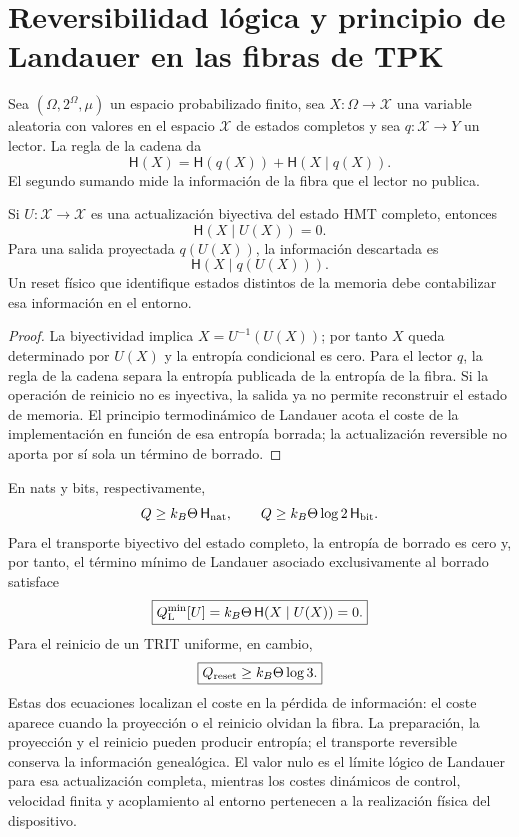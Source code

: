 \section{Reversibilidad lógica y principio de Landauer en las fibras de TPK}
\label{sec:informacion-fibra-landauer-rev7}

Sea \((\Omega,2^\Omega,\mu)\) un espacio probabilizado finito, sea
\(X:\Omega\to\mathcal X\) una variable aleatoria con valores en el espacio
\(\mathcal X\) de estados completos y sea \(q:\mathcal X\to Y\) un lector.
La regla de la cadena da
\[
 \mathsf H(X)
 =
 \mathsf H(q(X))+\mathsf H(X\mid q(X)).
\]
El segundo sumando mide la información de la fibra que el lector no
publica.

\begin{theorem}
\label{thm:landauer-relativo-lector-rev7}
Si \(U:\mathcal X\to\mathcal X\) es una actualización biyectiva del estado
HMT completo,
entonces
\[
 \boxed{\mathsf H(X\mid U(X))=0.}
\]
Para una salida proyectada \(q(U(X))\), la información descartada es
\[
 \mathsf H(X\mid q(U(X))).
\]
Un reset físico que identifique estados distintos de la memoria debe
contabilizar esa información en el entorno.
\end{theorem}

\begin{proof}
La biyectividad implica
\(X=U^{-1}(U(X))\); por tanto \(X\) queda determinado por \(U(X)\) y la
entropía condicional es cero. Para el lector \(q\), la regla de la cadena
separa la entropía publicada de la entropía de la fibra. Si la operación de
reinicio no es inyectiva, la salida ya no permite reconstruir el estado de
memoria. El
principio termodinámico de Landauer acota el coste de la implementación en
función de esa entropía borrada; la actualización reversible no aporta por
sí sola un término de borrado.
\end{proof}

En nats y bits, respectivamente,
\[
 Q\ge k_B\Theta\,\mathsf H_{\rm nat},
 \qquad
 Q\ge k_B\Theta\log 2\,\mathsf H_{\rm bit}.
\]
Para el transporte biyectivo del estado completo, la entropía de borrado es
cero y, por tanto, el término mínimo de Landauer asociado exclusivamente al
borrado satisface
\[
\boxed{Q_{\rm L}^{\min}[U]=k_B\Theta\,
 \mathsf H(X\mid U(X))=0.}
\]
Para el reinicio de un TRIT uniforme, en cambio,
\[
 \boxed{Q_{\rm reset}\ge k_B\Theta\log3.}
\]
Estas dos ecuaciones localizan el coste en la pérdida de información: el
coste aparece cuando la proyección o el reinicio olvidan la fibra.
La preparación, la proyección y el reinicio pueden producir entropía; el
transporte reversible conserva la información genealógica. El valor nulo es
el límite lógico de Landauer para esa actualización completa, mientras los
costes dinámicos de control, velocidad finita y acoplamiento al entorno
pertenecen a la realización física del dispositivo.

